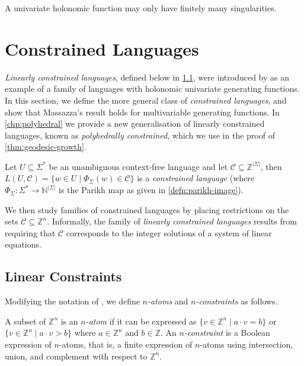 \begin{lemma}\label{lemma:holonomic-power-series-poles}
	A univariate holonomic function may only have finitely many singularities.
\end{lemma}

\section{Constrained Languages}\label{sec:constrained-languages}

\emph{Linearly constrained languages}, defined below in \cref{sec:linear-constraints}, were introduced by \textcite{massazza1993} as an example of a family of languages with holonomic univariate generating functions.
In this section, we define the more general class of \emph{constrained languages}, and show that Massazza's result holds for multivariable generating functions.
In \cref{chp:polyhedral} we provide a new generalisation of linearly constrained languages, known as \emph{polyhedrally constrained}, which we use in the proof of \cref{thm:geodesic-growth}.

\begin{definition}\label{defn:constrained-language}
Let $U \subseteq \Sigma^*$ be an unambiguous context-free language and let $\mathcal{C} \subseteq \mathbb{Z}^{|\Sigma|}$, then
$
	L(U,\mathcal{C})
	=
	\{
		w \in U
		\mid
		\Phi_\Sigma(w) \in \mathcal{C}
	\}
$
is a \emph{constrained language} (where $\Phi_\Sigma\colon \Sigma^* \to \mathbb{N}^{|\Sigma|}$ is the Parikh map as given in \cref{defn:parikh-image}).
\end{definition}

We then study families of constrained languages by placing restrictions on the sets $\mathcal{C} \subseteq \mathbb{Z}^n$.
Informally, the family of \emph{linearly constrained languages} results from requiring that $\mathcal{C}$ corresponds to the integer solutions of a system of linear equations.

\subsection{Linear Constraints}\label{sec:linear-constraints}

Modifying the notation of \textcite{massazza1993}, we define \emph{$n$-atoms} and \emph{$n$-constraints} as follows.

\begin{definition}\label{defn:n-constraints}
A subset of $\mathbb{Z}^{n}$ is an \emph{$n$-atom} if it can be expressed as
$
	\{
		v \in \mathbb{Z}^{n}
	\mid
		a \cdot v = b
	\}
$
or
$ 
	\{
		v \in \mathbb{Z}^{n}
	\mid
		a \cdot v > b
	\}
$
where $a \in \mathbb{Z}^{n}$ and $b \in \mathbb{Z}$.
An \emph{$n$-constraint} is a Boolean expression of $n$-atoms, that is, a finite expression of $n$-atoms using intersection, union, and complement with respect to $\mathbb{Z}^{n}$.
\end{definition}

